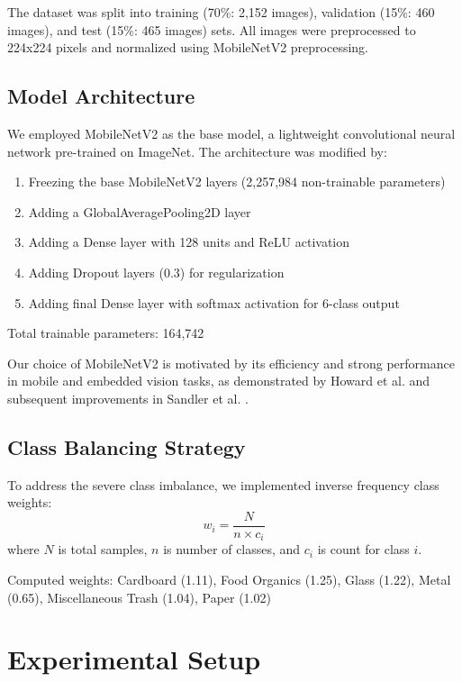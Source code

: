 \documentclass[conference]{IEEEtran}
\begin{document}
The dataset was split into training (70\%: 2,152 images), validation (15\%: 460 images), and test (15\%: 465 images) sets. All images were preprocessed to 224x224 pixels and normalized using MobileNetV2 preprocessing.

\subsection{Model Architecture}
We employed MobileNetV2 as the base model, a lightweight convolutional neural network pre-trained on ImageNet. The architecture was modified by:
\begin{enumerate}
    \item Freezing the base MobileNetV2 layers (2,257,984 non-trainable parameters)
    \item Adding a GlobalAveragePooling2D layer
    \item Adding a Dense layer with 128 units and ReLU activation
    \item Adding Dropout layers (0.3) for regularization
    \item Adding final Dense layer with softmax activation for 6-class output
\end{enumerate}

Total trainable parameters: 164,742

Our choice of MobileNetV2 is motivated by its efficiency and strong performance in mobile and embedded vision tasks, as demonstrated by Howard et al. \cite{howard2019} and subsequent improvements in Sandler et al. \cite{sandler2018}.

\subsection{Class Balancing Strategy}
To address the severe class imbalance, we implemented inverse frequency class weights:
\begin{equation}
    w_i = \frac{N}{n \times c_i}
\end{equation}
where $N$ is total samples, $n$ is number of classes, and $c_i$ is count for class $i$.

Computed weights: Cardboard (1.11), Food Organics (1.25), Glass (1.22), Metal (0.65), Miscellaneous Trash (1.04), Paper (1.02)

\section{Experimental Setup}
\end{document}

